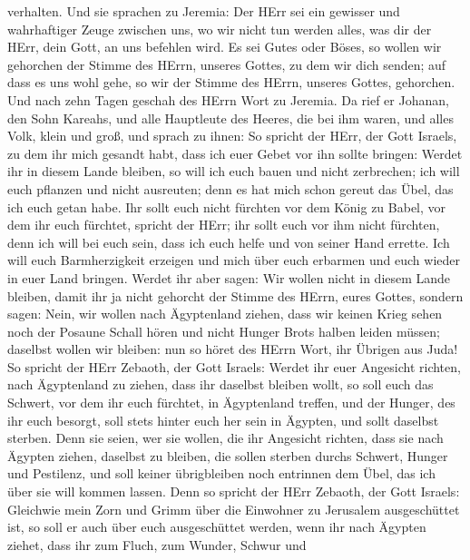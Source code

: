 verhalten.  Und sie sprachen zu Jeremia: Der HErr sei ein
gewisser und wahrhaftiger Zeuge zwischen uns, wo wir nicht tun werden
alles, was dir der HErr, dein Gott, an uns befehlen wird. 
Es sei Gutes oder Böses, so wollen wir gehorchen der Stimme des HErrn,
unseres Gottes, zu dem wir dich senden; auf dass es uns wohl gehe, so
wir der Stimme des HErrn, unseres Gottes, gehorchen.  Und
nach zehn Tagen geschah des HErrn Wort zu Jeremia.  Da rief
er Johanan, den Sohn Kareahs, und alle Hauptleute des Heeres, die bei
ihm waren, und alles Volk, klein und groß,  und sprach zu
ihnen: So spricht der HErr, der Gott Israels, zu dem ihr mich gesandt
habt, dass ich euer Gebet vor ihn sollte bringen:  Werdet
ihr in diesem Lande bleiben, so will ich euch bauen und nicht
zerbrechen; ich will euch pflanzen und nicht ausreuten; denn es hat mich
schon gereut das Übel, das ich euch getan habe.  Ihr sollt
euch nicht fürchten vor dem König zu Babel, vor dem ihr euch fürchtet,
spricht der HErr; ihr sollt euch vor ihm nicht fürchten, denn ich will
bei euch sein, dass ich euch helfe und von seiner Hand errette.
 Ich will euch Barmherzigkeit erzeigen und mich über euch
erbarmen und euch wieder in euer Land bringen.  Werdet ihr
aber sagen: Wir wollen nicht in diesem Lande bleiben, damit ihr ja nicht
gehorcht der Stimme des HErrn, eures Gottes,  sondern
sagen: Nein, wir wollen nach Ägyptenland ziehen, dass wir keinen Krieg
sehen noch der Posaune Schall hören und nicht Hunger Brots halben leiden
müssen; daselbst wollen wir bleiben:  nun so höret des
HErrn Wort, ihr Übrigen aus Juda! So spricht der HErr Zebaoth, der Gott
Israels: Werdet ihr euer Angesicht richten, nach Ägyptenland zu ziehen,
dass ihr daselbst bleiben wollt,  so soll euch das Schwert,
vor dem ihr euch fürchtet, in Ägyptenland treffen, und der Hunger, des
ihr euch besorgt, soll stets hinter euch her sein in Ägypten, und sollt
daselbst sterben.  Denn sie seien, wer sie wollen, die ihr
Angesicht richten, dass sie nach Ägypten ziehen, daselbst zu bleiben,
die sollen sterben durchs Schwert, Hunger und Pestilenz, und soll keiner
übrigbleiben noch entrinnen dem Übel, das ich über sie will kommen
lassen.  Denn so spricht der HErr Zebaoth, der Gott
Israels: Gleichwie mein Zorn und Grimm über die Einwohner zu Jerusalem
ausgeschüttet ist, so soll er auch über euch ausgeschüttet werden, wenn
ihr nach Ägypten ziehet, dass ihr zum Fluch, zum Wunder, Schwur und
